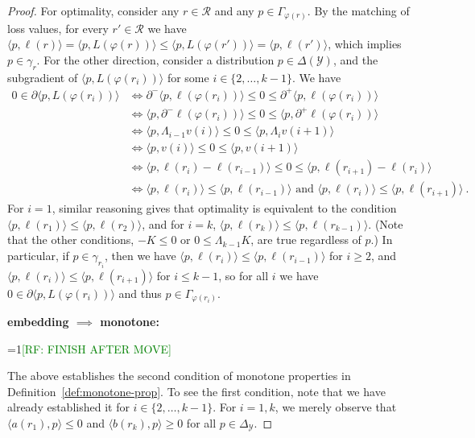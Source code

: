 \documentclass[anon]{colt2020} %
\newcommand{\Comments}{1}
\newcommand{\mynote}[2]{\ifnum\Comments=1\textcolor{#1}{#2}\fi}
\newcommand{\raf}[1]{\mynote{green}{[RF: #1]}}
\newcommand{\simplex}{\Delta_\Y}
\newcommand{\R}{\mathcal{R}}
\newcommand{\Y}{\mathcal{Y}}
\newcommand{\inprod}[2]{\langle #1, #2 \rangle}%
\begin{document}
\begin{proof}
  For optimality, consider any $r\in\R$ and any $p\in\Gamma_{\varphi(r)}$.
  By the matching of loss values, for every $r'\in\R$ we have  $\inprod{p}{\ell(r)} = \inprod{p}{L(\varphi(r))} \leq \inprod{p}{L(\varphi(r'))} = \inprod{p}{\ell(r')}$, which implies $p\in\gamma_r$.
  For the other direction, consider a distribution $p\in\Delta(\Y)$, and the subgradient of $\inprod{p}{L(\varphi(r_i))}$ for some $i\in\{2,\ldots,k-1\}$.
  We have
  \begin{align*}
    0\in\partial\inprod{p}{L(\varphi(r_i))}
    &\iff \partial^-\inprod{p}{\ell(\varphi(r_i))} \leq 0 \leq \partial^+\inprod{p}{\ell(\varphi(r_i))}
    \\
    &\iff \inprod{p}{\partial^-\ell(\varphi(r_i))} \leq 0 \leq \inprod{p}{\partial^+\ell(\varphi(r_i))}
    \\
    &\iff \inprod{p}{\Lambda_{i-1} v(i)} \leq 0 \leq \inprod{p}{\Lambda_i v(i+1)}
    \\
    &\iff \inprod{p}{v(i)} \leq 0 \leq \inprod{p}{v(i+1)}
    \\
    &\iff \inprod{p}{\ell(r_i)-\ell(r_{i-1})} \leq 0 \leq \inprod{p}{\ell(r_{i+1})-\ell(r_i)}
    \\
    &\iff \inprod{p}{\ell(r_i)} \leq \inprod{p}{\ell(r_{i-1})} \text{ and } \inprod{p}{\ell(r_i)} \leq \inprod{p}{\ell(r_{i+1})}~.
  \end{align*}
  For $i=1$, similar reasoning gives that optimality is equivalent to the condition $\inprod{p}{\ell(r_1)} \leq \inprod{p}{\ell(r_{2})}$, and for $i=k$, $\inprod{p}{\ell(r_k)} \leq \inprod{p}{\ell(r_{k-1})}$.
  (Note that the other conditions, $-K \leq 0$ or $0 \leq \Lambda_{k-1} K$, are true regardless of $p$.)
  In particular, if $p \in \gamma_{r_i}$, then we have $\inprod{p}{\ell(r_i)} \leq \inprod{p}{\ell(r_{i-1})}$ for $i \geq 2$, and $\inprod{p}{\ell(r_i)} \leq \inprod{p}{\ell(r_{i+1})}$ for $i \leq k-1$, so for all $i$ we have $0\in\partial\inprod{p}{L(\varphi(r_i))}$ and thus $p \in \Gamma_{\varphi(r_i)}$.

  \noindent\textbf{embedding $\implies$ monotone:}

  \raf{FINISH AFTER MOVE}

  The above establishes the second condition of monotone properties in Definition~\ref{def:monotone-prop}.
  To see the first condition, note that we have already established it for $i\in\{2,\ldots,k-1\}$.
  For $i=1,k$, we merely observe that $\inprod{a(r_1)}{p} \leq 0$ and $\inprod{b(r_k)}{p} \geq 0$ for all $p\in\simplex$.

  


\end{proof}
\end{document}

